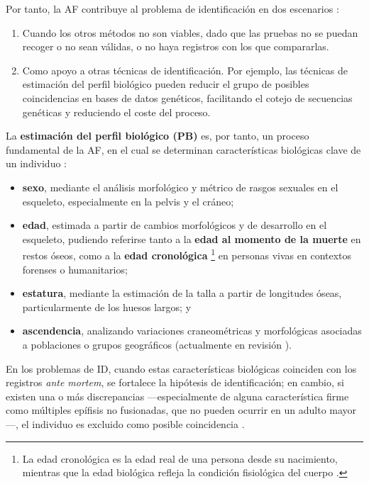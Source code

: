 Por tanto, la AF contribuye al problema de identificación en dos escenarios \cite{swganth2010}:  

\begin{enumerate}

    \item Cuando los otros métodos no son viables, dado que las pruebas no se puedan recoger o no sean válidas, o 
    no haya registros con los que compararlas.
    
    \item Como apoyo a otras técnicas de identificación. Por ejemplo, las técnicas de estimación del perfil 
    biológico pueden reducir el grupo de posibles coincidencias en bases de datos genéticos, facilitando el 
    cotejo de secuencias genéticas y reduciendo el coste del proceso.  

\end{enumerate}

La \textbf{estimación del perfil biológico (PB)} es, por tanto, un proceso fundamental de la AF, en el cual
se determinan características biológicas clave de un individuo \cite{byers2023}: 

\begin{itemize}
    \item \textbf{sexo}, mediante el análisis morfológico y métrico de rasgos sexuales en el esqueleto, 
    especialmente en la pelvis y el cráneo;
    \item \textbf{edad}, estimada a partir de cambios morfológicos y de desarrollo en el esqueleto, pudiendo 
    referirse tanto a la \textbf{edad al momento de la muerte} en restos óseos, como a la \textbf{edad cronológica} 
    \footnote{La edad cronológica es la edad real de una persona desde su nacimiento, mientras que la edad
    biológica refleja la condición fisiológica del cuerpo \cite{marcante2025}.}
    en personas vivas en contextos forenses o humanitarios;
    \item \textbf{estatura}, mediante la estimación de la talla a partir de longitudes óseas, particularmente 
    de los huesos largos; y
    \item \textbf{ascendencia}, analizando variaciones craneométricas y morfológicas asociadas a poblaciones 
    o grupos geográficos (actualmente en revisión \cite{ross2021a, ross2021b, flouri2022}).
\end{itemize}

En los problemas de ID, cuando estas características biológicas coinciden con los registros \textit{ante mortem}, 
se fortalece la hipótesis de identificación; en cambio, si existen una o más discrepancias ---especialmente de 
alguna característica firme como múltiples epífisis no fusionadas, que no pueden ocurrir en un adulto mayor---, 
el individuo es excluido como posible coincidencia \cite{byers2023}. 


